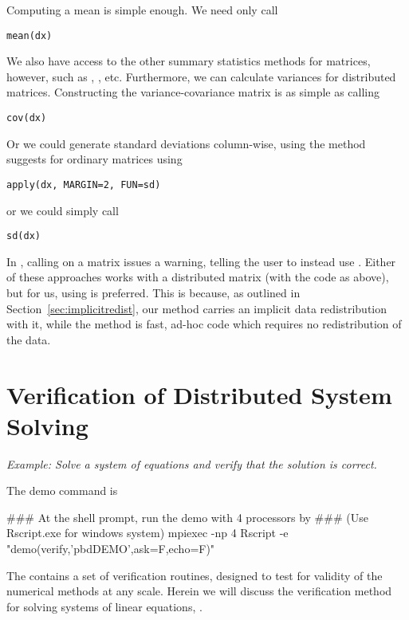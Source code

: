 Computing a mean is simple enough.  We need only call
\begin{lstlisting}[language=rr,title=Summary Statistics]
mean(dx)
\end{lstlisting}
We also have access to the other summary statistics methods for matrices,
however, such as , , etc. Furthermore, we
can calculate variances for distributed matrices. Constructing the
variance-covariance matrix is as simple as calling
\begin{lstlisting}[language=rr,title=Summary Statistics]
cov(dx)
\end{lstlisting}
Or we could generate standard deviations column-wise, using the method
 suggests for ordinary matrices using 
\begin{lstlisting}[language=rr,title=Summary Statistics]
apply(dx, MARGIN=2, FUN=sd)
\end{lstlisting}
or we could simply call
\begin{lstlisting}[language=rr,title=Summary Statistics]
sd(dx)
\end{lstlisting}
In , calling  on a matrix issues a warning, telling
the user to instead use . Either of these approaches works
with a distributed matrix (with the code as above), but for us,
using  is preferred.  This is because, as outlined in
Section~\ref{sec:implicitredist}, our  method carries an
implicit data redistribution with it, while the  method is
fast, ad-hoc code which requires no redistribution of the data.





\section{Verification of Distributed System Solving}
\label{sec:Verification_of_Distributed_System_Solving}

\emph{Example:  Solve a system of equations and verify that the solution
      is correct.}

The demo command is
\begin{Command}
### At the shell prompt, run the demo with 4 processors by
### (Use Rscript.exe for windows system)
mpiexec -np 4 Rscript -e "demo(verify,'pbdDEMO',ask=F,echo=F)"
\end{Command}

The  contains a set of verification routines, designed to test
for validity of the numerical methods at any scale. Herein we will discuss
the verification method for solving systems of linear equations,
.

